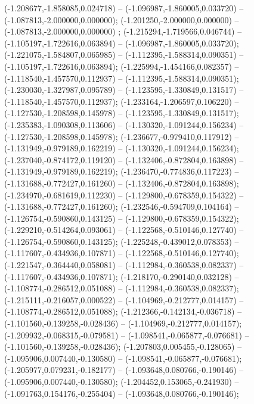  (-1.208677,-1.858085,0.024718) -- (-1.096987,-1.860005,0.033720) -- (-1.087813,-2.000000,0.000000);
 (-1.201250,-2.000000,0.000000) -- (-1.087813,-2.000000,0.000000) ;
 (-1.215294,-1.719566,0.046744) -- (-1.105197,-1.722616,0.063894) -- (-1.096987,-1.860005,0.033720);
 (-1.221075,-1.584807,0.065985) -- (-1.112395,-1.588314,0.090351) -- (-1.105197,-1.722616,0.063894);
 (-1.225994,-1.454166,0.082357) -- (-1.118540,-1.457570,0.112937) -- (-1.112395,-1.588314,0.090351);
 (-1.230030,-1.327987,0.095789) -- (-1.123595,-1.330849,0.131517) -- (-1.118540,-1.457570,0.112937);
 (-1.233164,-1.206597,0.106220) -- (-1.127530,-1.208598,0.145978) -- (-1.123595,-1.330849,0.131517);
 (-1.235383,-1.090308,0.113606) -- (-1.130320,-1.091244,0.156234) -- (-1.127530,-1.208598,0.145978);
 (-1.236677,-0.979410,0.117912) -- (-1.131949,-0.979189,0.162219) -- (-1.130320,-1.091244,0.156234);
 (-1.237040,-0.874172,0.119120) -- (-1.132406,-0.872804,0.163898) -- (-1.131949,-0.979189,0.162219);
 (-1.236470,-0.774836,0.117223) -- (-1.131688,-0.772427,0.161260) -- (-1.132406,-0.872804,0.163898);
 (-1.234970,-0.681619,0.112230) -- (-1.129800,-0.678359,0.154322) -- (-1.131688,-0.772427,0.161260);
 (-1.232546,-0.594709,0.104164) -- (-1.126754,-0.590860,0.143125) -- (-1.129800,-0.678359,0.154322);
 (-1.229210,-0.514264,0.093061) -- (-1.122568,-0.510146,0.127740) -- (-1.126754,-0.590860,0.143125);
 (-1.225248,-0.439012,0.078353) -- (-1.117607,-0.434936,0.107871) -- (-1.122568,-0.510146,0.127740);
 (-1.221547,-0.364440,0.058081) -- (-1.112984,-0.360538,0.082337) -- (-1.117607,-0.434936,0.107871);
 (-1.218170,-0.290140,0.032128) -- (-1.108774,-0.286512,0.051088) -- (-1.112984,-0.360538,0.082337);
 (-1.215111,-0.216057,0.000522) -- (-1.104969,-0.212777,0.014157) -- (-1.108774,-0.286512,0.051088);
 (-1.212366,-0.142134,-0.036718) -- (-1.101560,-0.139258,-0.028436) -- (-1.104969,-0.212777,0.014157);
 (-1.209932,-0.068315,-0.079581) -- (-1.098541,-0.065877,-0.076681) -- (-1.101560,-0.139258,-0.028436);
 (-1.207803,0.005455,-0.128065) -- (-1.095906,0.007440,-0.130580) -- (-1.098541,-0.065877,-0.076681);
 (-1.205977,0.079231,-0.182177) -- (-1.093648,0.080766,-0.190146) -- (-1.095906,0.007440,-0.130580);
 (-1.204452,0.153065,-0.241930) -- (-1.091763,0.154176,-0.255404) -- (-1.093648,0.080766,-0.190146);
